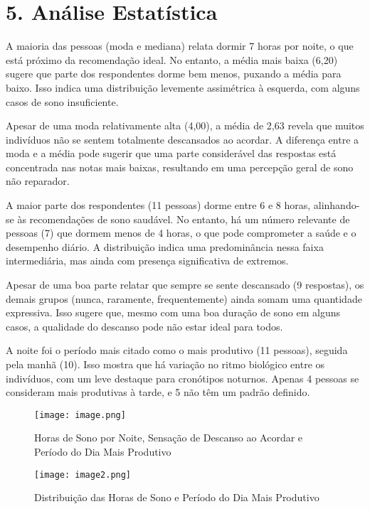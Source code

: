 \documentclass[12pt,a4paper]{article}
\begin{document}
\section*{5. Análise Estatística}

A maioria das pessoas (moda e mediana) relata dormir 7 horas por noite, o que está próximo da recomendação ideal. No entanto, a média mais baixa (6,20) sugere que parte dos respondentes dorme bem menos, puxando a média para baixo. Isso indica uma distribuição levemente assimétrica à esquerda, com alguns casos de sono insuficiente.

Apesar de uma moda relativamente alta (4,00), a média de 2,63 revela que muitos indivíduos não se sentem totalmente descansados ao acordar. A diferença entre a moda e a média pode sugerir que uma parte considerável das respostas está concentrada nas notas mais baixas, resultando em uma percepção geral de sono não reparador.

A maior parte dos respondentes (11 pessoas) dorme entre 6 e 8 horas, alinhando-se às recomendações de sono saudável. No entanto, há um número relevante de pessoas (7) que dormem menos de 4 horas, o que pode comprometer a saúde e o desempenho diário. A distribuição indica uma predominância nessa faixa intermediária, mas ainda com presença significativa de extremos.

Apesar de uma boa parte relatar que sempre se sente descansado (9 respostas), os demais grupos (nunca, raramente, frequentemente) ainda somam uma quantidade expressiva. Isso sugere que, mesmo com uma boa duração de sono em alguns casos, a qualidade do descanso pode não estar ideal para todos.

A noite foi o período mais citado como o mais produtivo (11 pessoas), seguida pela manhã (10). Isso mostra que há variação no ritmo biológico entre os indivíduos, com um leve destaque para cronótipos noturnos. Apenas 4 pessoas se consideram mais produtivas à tarde, e 5 não têm um padrão definido.


\begin{figure}
    \centering
    \texttt{[image: image.png]}
    \caption{Horas de Sono por Noite, Sensação de Descanso ao Acordar e Período do Dia Mais Produtivo}
    \label{fig:enter-label}
\end{figure}

\begin{figure}
    \centering
    \texttt{[image: image2.png]}
    \caption{Distribuição das Horas de Sono e Período do Dia Mais Produtivo}
    \label{fig:enter-label}
\end{figure}
\end{document}
